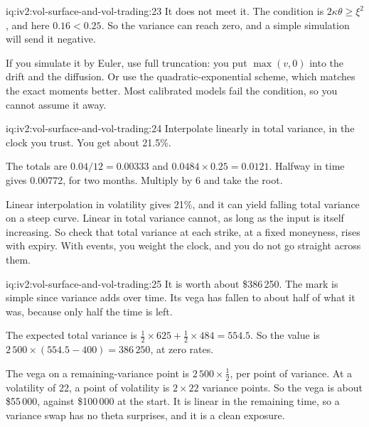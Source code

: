 \begin{solution}{iq:iv2:vol-surface-and-vol-trading:23}
It does not meet it. The condition is $2\kappa\theta \geq \xi^2$, and here $0.16 < 0.25$. So the variance can reach zero, and a simple simulation will send it negative.

If you simulate it by Euler, use full truncation: you put $\max(v, 0)$ into the drift and the diffusion. Or use the quadratic-exponential scheme, which matches the exact moments better. Most calibrated models fail the condition, so you cannot assume it away.

\end{solution}

\begin{solution}{iq:iv2:vol-surface-and-vol-trading:24}
Interpolate linearly in total variance, in the clock you trust. You get about 21.5\%.

The totals are $0.04/12 = 0.00333$ and $0.0484 \times 0.25 = 0.0121$. Halfway in time gives 0.00772, for two months. Multiply by 6 and take the root.

Linear interpolation in volatility gives 21\%, and it can yield falling total variance on a steep curve. Linear in total variance cannot, as long as the input is itself increasing. So check that total variance at each strike, at a fixed moneyness, rises with expiry. With events, you weight the clock, and you do not go straight across them.

\end{solution}

\begin{solution}{iq:iv2:vol-surface-and-vol-trading:25}
It is worth about \$386\,250. The mark is simple since variance adds over time. Its vega has fallen to about half of what it was, because only half the time is left.

The expected total variance is $\tfrac12 \times 625 + \tfrac12 \times 484 = 554.5$. So the value is $2\,500 \times (554.5 - 400) = 386\,250$, at zero rates.

The vega on a remaining-variance point is $2\,500 \times \tfrac12$, per point of variance. At a volatility of 22, a point of volatility is $2 \times 22$ variance points. So the vega is about \$55\,000, against \$100\,000 at the start. It is linear in the remaining time, so a variance swap has no theta surprises, and it is a clean exposure.

\end{solution}

